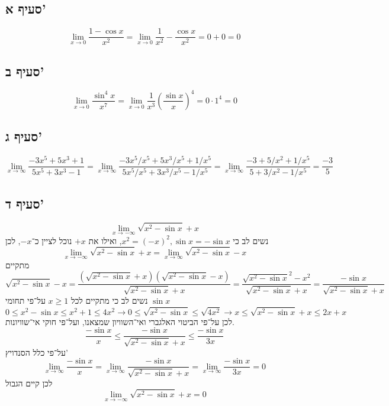 \subsection{סעיף א'}
\[
	\lim_{x \to 0} \frac{1 - \cos x}{x^2}
	= \lim_{x \to 0} \frac{1}{x^2} - \frac{\cos x}{x^2}
	= 0 + 0 = 0
\]

\subsection{סעיף ב'}
\[
	\lim_{x \to 0} \frac{\sin^4 x}{x^7}
	= \lim_{x \to 0} \frac{1}{x^3} \left( \frac{\sin x}{x} \right)^4
	= 0 \cdot 1^4
	= 0
\]

\subsection{סעיף ג'}
\[
	\lim_{x \to \infty} \frac{-3x^5 + 5x^3 + 1}{5x^5 + 3x^3 - 1}
	= \lim_{x \to \infty} \frac{-3x^5/x^5 + 5x^3/x^5 + 1/x^5}{5x^5/x^5 + 3x^3/x^5 - 1/x^5}
	= \lim_{x \to \infty} \frac{-3 + 5/x^2 + 1/x^5}{5 + 3/x^2 - 1/x^5}
	= \frac{-3}{5}
\]

\subsection{סעיף ד'}
\[
	\lim_{x \to -\infty} \sqrt{x^2 - \sin x} + x
\]
נשים לב כי $x^2 = (-x)^2, \sin x = - \sin x$, ואילו את $+x$ נוכל לציין כ־$-x$, לכן
\[
	\lim_{x \to -\infty} \sqrt{x^2 - \sin x} + x
	= \lim_{x \to \infty} \sqrt{x^2 - \sin x} - x
\]
מתקיים
\[
	\sqrt{x^2 - \sin x} - x
	= \frac{\left(\sqrt{x^2 - \sin x} + x\right) \left(\sqrt{x^2 - \sin x} - x\right)}{\sqrt{x^2 - \sin x} + x}
	= \frac{ \sqrt{x^2 - \sin x}^2 - x^2}{\sqrt{x^2 - \sin x} + x}
	= \frac{ -\sin x}{\sqrt{x^2 - \sin x} + x}
\]
נשים לב כי מתקיים לכל $x \ge 1$ על־פי תחומי $\sin x$
\[
	0 \le x^2 - \sin x \le x^2 + 1 \le 4x^2
	\rightarrow
	0 \le \sqrt{x^2 - \sin x} \le \sqrt{4x^2}
	\rightarrow
	x \le \sqrt{x^2 - \sin x} + x \le 2x + x
\]
לכן על־פי הביטוי האלגברי ואי־השוויון שמצאנו, ועל־פי חוקי אי־שוויונות.
\[
	\frac{ -\sin x}{x}
	\le
	\frac{ -\sin x}{\sqrt{x^2 - \sin x} + x}
	\le
	\frac{ -\sin x}{3x}
\]
על־פי כלל הסנדויץ'
\[
	\lim_{x \to \infty} \frac{ -\sin x}{x}
	= \lim_{x \to \infty} \frac{ -\sin x}{\sqrt{x^2 - \sin x} + x}
	= \lim_{x \to \infty} \frac{ -\sin x}{3x}
	= 0
\]
לכן קיים הגבול
\[
	\lim_{x \to -\infty} \sqrt{x^2 - \sin x} + x = 0
\]

